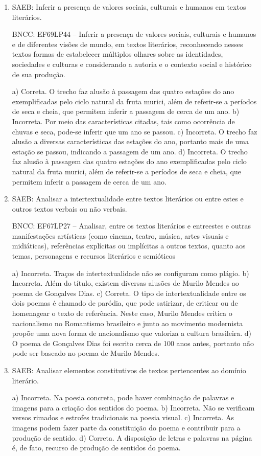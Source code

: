 \begin{enumerate}

\item
SAEB: Inferir a presença de valores sociais, culturais e humanos em
textos literários.

BNCC: EF69LP44 -- Inferir a presença de valores sociais,
culturais e humanos e de diferentes visões de mundo, em textos
literários, reconhecendo nesses textos formas de estabelecer múltiplos
olhares sobre as identidades, sociedades e culturas e considerando a
autoria e o contexto social e histórico de sua produção.

a) Correta. O trecho faz alusão à passagem das quatro estações do ano
   exemplificadas pelo ciclo natural da fruta murici, além de referir-se a
   períodos de seca e cheia, que permitem inferir a passagem de cerca de um
   ano.
b) Incorreta. Por meio das características citadas, tais como ocorrência de
   chuvas e seca, pode-se inferir que um ano se passou.
c) Incorreta. O trecho faz alusão a diversas características das estações do
   ano, portanto mais de uma estação se passou, indicando a passagem de um
   ano.
d) Incorreta. O trecho faz alusão à passagem das quatro estações do ano
   exemplificadas pelo ciclo natural da fruta murici, além de referir-se a
   períodos de seca e cheia, que permitem inferir a passagem de cerca de um
   ano.

\item
SAEB: Analisar a intertextualidade entre textos literários ou entre
estes e outros textos verbais ou não verbais.

BNCC: EF67LP27 -- Analisar, entre os textos literários e entreestes e outras manifestações artísticas (como cinema, teatro, música,
artes visuais e midiáticas), referências explícitas ou implícitas a
outros textos, quanto aos temas, personagens e recursos literários e
semióticos

a) Incorreta. Traços de intertextualidade não se configuram como plágio.
b) Incorreta. Além do título, existem diversas alusões de Murilo Mendes ao 
poema de Gonçalves Dias.
c) Correta. O tipo de intertextualidade entre os dois poemas é chamado de
paródia, que pode satirizar, de criticar ou de homenagear o texto de referência.
Neste caso, Murilo Mendes critica o nacionalismo no Romantismo
brasileiro e junto ao movimento modernista propõe uma nova forma de
nacionalismo que valoriza a cultura brasileira.
d)  O poema de Gonçalves Dias foi escrito cerca de 100 anos antes,
portanto não pode ser baseado no poema de Murilo Mendes.

\item
SAEB: Analisar elementos constitutivos de textos pertencentes ao domínio
literário.

a) Incorreta. Na poesia concreta, pode haver combinação de palavras e imagens 
para a criação dos sentidos do poema.
b) Incorreta. Não se verificam versos rimados e estrofes tradicionais na poesia
visual. 
c) Incorreta. As imagens podem fazer parte da constituição do poema e contribuir
para a produção de sentido.
d) Correta. A disposição de letras e palavras na página é, de fato, recurso de
produção de sentidos do poema.

\end{enumerate}

